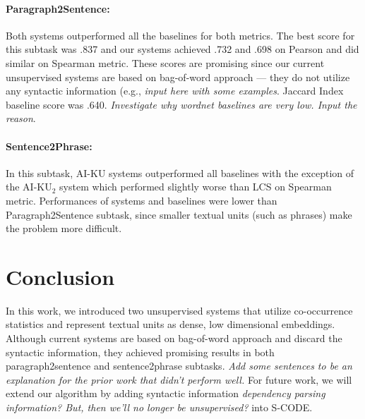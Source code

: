 \documentclass[11pt]{article}
\begin{document}
\paragraph{Paragraph2Sentence:} Both systems outperformed all the baselines for both metrics. The best score for this subtask was .837 and our systems achieved .732 and .698 on Pearson and did similar on Spearman metric. These scores are promising since our current unsupervised systems are based on bag-of-word approach --- they do not utilize any syntactic information (e.g., \emph{input here with some examples}. Jaccard Index baseline score was .640. \emph{Investigate why wordnet baselines are very low. Input the reason}.

\paragraph{Sentence2Phrase:} In this subtask, AI-KU systems outperformed all baselines with the exception of the AI-KU$_2$ system which performed slightly worse than LCS on Spearman metric. Performances of systems and baselines were lower than Paragraph2Sentence subtask, since smaller textual units (such as phrases) make the problem more difficult.

\section{Conclusion}
\label{conclusion}

In this work, we introduced two unsupervised systems that utilize co-occurrence statistics and represent textual units as dense, low dimensional embeddings. 
Although current systems are based on bag-of-word approach and discard the syntactic information, they achieved promising results in both paragraph2sentence and sentence2phrase subtasks. \emph{Add some sentences to be an explanation for the prior work that didn't perform well.} For future work, we will extend our algorithm by adding syntactic information \emph{dependency parsing information? But, then we'll no longer be unsupervised?} into S-CODE.  



% 




\end{document}
